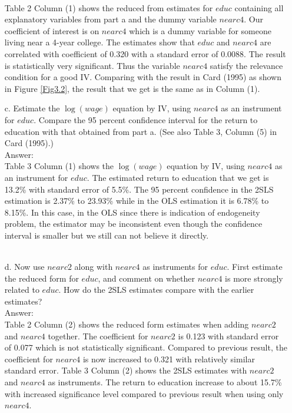 \documentclass[10pt]{article}
\begin{document}
\begin{enumerate}
\begin{figure}[h]
\end{figure}\\
Table 2 Column (1) shows the reduced from estimates for $educ$ containing all explanatory variables from part a and the dummy variable $nearc4.$ Our coefficient of interest is on $nearc4$ which is a dummy variable for someone living near a 4-year college. The estimates show that $educ$ and $nearc4$ are correlated with coefficient of 0.320 with a standard error of 0.0088. The result is statistically very significant. Thus the variable $nearc4$ satisfy the relevance condition for a good IV. Comparing with the result in Card (1995) as shown in Figure \ref{Fig3.2}, the result that we get is the same as in Column (1).
\\


\item[c.] Estimate the $\log(wage)$ equation by IV, using $nearc4$ as an instrument for $educ.$ Compare the 95 percent confidence interval for the return to education with that obtained from part a. (See also Table 3, Column (5) in Card (1995).)
\\ Answer:\\
Table 3 Column (1) shows the $\log(wage)$ equation by IV, using $nearc4$ as an instrument for $educ.$ The estimated return to education that we get is 13.2\% with standard error of 5.5\%. The 95 percent confidence in the 2SLS estimation is 2.37\% to 23.93\% while in the OLS estimation it is 6.78\% to 8.15\%. In this case, in the OLS since there is indication of endogeneity problem, the estimator may be inconsistent even though the confidence interval is smaller but we still can not believe it directly. 
\\ \\





\item[d.] Now use $nearc2$ along with $nearc4$ as instruments for $educ$. First estimate the reduced form for $educ$, and comment on whether $nearc4$ is more strongly related to $educ$. How do the 2SLS estimates compare with the earlier estimates?
\\ Answer:\\
Table 2 Column (2) shows the reduced form estimates when adding $nearc2$ and $nearc4$ together. The coefficient for $nearc2$ is 0.123 with standard error of 0.077 which is not statistically significant. Compared to previous result, the coefficient for $nearc4$ is now increased to 0.321 with relatively similar standard error. Table 3 Column (2) shows the 2SLS estimates with $nearc2$ and $nearc4$ as instruments. The return to education increase to about 15.7\% with increased significance level compared to previous result when using only $nearc4$.




\end{enumerate}
\end{document}
